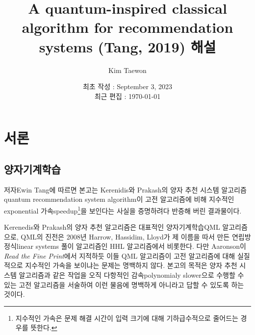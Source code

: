 \documentclass[a4paper,atbegshi,chapter]{oblivoir}
\title{A quantum-inspired classical algorithm for recommendation systems (Tang,
2019) 해설}
\author{Kim Taewon}
\date{최초 작성 : September 3, 2023 \\ 최근 편집 : \today}
\begin{document}
\maketitle
\tableofcontents
\chapter{서론}
\section{양자기계학습}
저자{\tiny Ewin Tang}에 따르면 본고는 Kerenidis와 Prakash의 양자 추천
시스템 알고리즘{\tiny quantum recommendation system algorithm}이 고전
알고리즘에 비해 지수적인{\tiny exponential} 가속{\tiny speedup}\footnote{지수적인
가속은 문제 해결 시간이 입력 크기에 대해 기하급수적으로 줄어드는 경우를 뜻한다.}을
보인다는 사실을 증명하려다 반증해 버린 결과물이다. 

Kerenedis와 Prakash의 양자 추천 알고리즘은 대표적인 양자기계학습{\tiny QML}
알고리즘으로, QML의 진전은 2008년 Harrow, Hassidim, Lloyd가 제 이름을 따서
만든 연립방정식{\tiny linear systems} 풀이 알고리즘인 HHL 알고리즘에서 
비롯한다. 다만 Aaronson이 \emph{Read the Fine Print}에서 지적하듯
이들 QML 알고리즘이 고전 알고리즘에 대해 실질적으로 지수적인 가속을 보이냐는
문제는 명백하지 않다. 본고의 목적은 양자 추천 시스템 알고리즘과 같은 작업을
오직 다항적인 감속{\tiny polynomialy slower}으로 수행할 수 있는 고전 알고리즘을
서술하여 이런 물음에 명백하게 아니라고 답할 수 있도록 하는 것이다.
\end{document}
